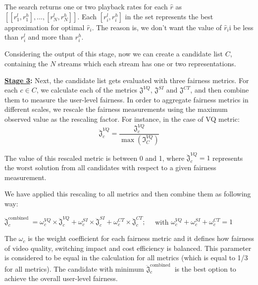 \documentclass[12pt]{article}
\begin{document}
The search returns one or two playback rates for each $\hat{r}$ as $[[r_1^l,r_1^h ],...,[r_N^l,r_N^h ]]$. Each $[r_i^l,r_i^h]$ in the set represents the best approximation for optimal $\hat{r}_i$. The reason is, we don’t want the value of $\hat{r}_i$i be less than $r_i^l$ and more than $r_i^h$. 

Considering the output of this stage, now we can create a candidate list $C$, containing the $N$ streams which each stream has one or two representations.

\textbf{\underline{Stage 3}:} Next, the candidate list gets evaluated with three fairness metrics. For each $c\in C$, we calculate each of the metrics $\mathfrak{J}^{V Q}$, $\mathfrak{J}^{S I}$ and $\mathfrak{J}^{C T}$, and then combine them to measure the user-level fairness. In order to aggregate fairness metrics in different scales, we rescale the fairness measurements using the maximum observed value as the rescaling factor. For instance, in the case of VQ metric:
\begin{equation}
\ddot{\mathfrak{J}}_{c}^{V Q}=\frac{\mathfrak{J}_{c}^{V Q}}{\max \left(\mathfrak{I}_{C}^{V Q}\right)}
\end{equation}

The value of this rescaled metric is between 0 and 1, where $\ddot{\mathfrak{J}}_{c}^{V Q}=1$ represents the worst solution from all candidates with respect to a given fairness measurement. 

We have applied this rescaling to all metrics and then combine them as following way:

$\ddot{\mathfrak{J}}_{c}^{\text {combined }}=\omega_{c}^{V Q} \times \ddot{\mathfrak{J}}_{c}^{V Q}+\omega_{c}^{S I} \times \ddot{\mathfrak{J}}_{c}^{S I}+\omega_{c}^{C T} \times \ddot{\mathfrak{J}}_{c}^{C T} ; \quad$ with $\omega_{c}^{V Q}+\omega_{c}^{S I}+\omega_{c}^{C T}=1$

The $\omega_c$ is the weight coefficient for each fairness metric and it defines how fairness of video quality, switching impact and cost efficiency is balanced. This parameter is considered to be equal in the calculation for all metrics (which is equal to 1/3 for all metrics).
The candidate with minimum $\ddot{\mathfrak{J}}_{c}^{\text {combined }}$ is the best option to achieve the overall user-level fairness.

\end{document}
